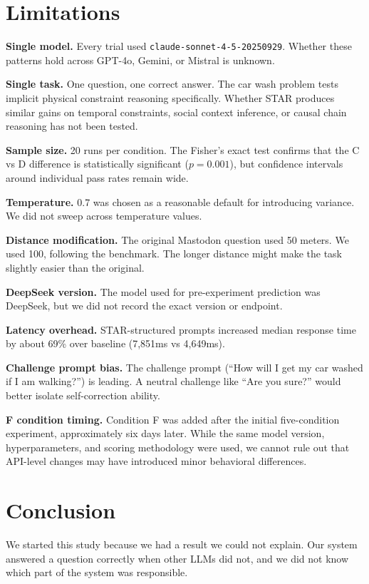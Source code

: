 \documentclass[11pt]{article}
\begin{document}
\section{Limitations}

\textbf{Single model.} Every trial used \texttt{claude-sonnet-4-5-20250929}. Whether these patterns hold across GPT-4o, Gemini, or Mistral is unknown.

\textbf{Single task.} One question, one correct answer. The car wash problem tests implicit physical constraint reasoning specifically. Whether STAR produces similar gains on temporal constraints, social context inference, or causal chain reasoning has not been tested.

\textbf{Sample size.} 20 runs per condition. The Fisher's exact test confirms that the C vs D difference is statistically significant ($p = 0.001$), but confidence intervals around individual pass rates remain wide.

\textbf{Temperature.} 0.7 was chosen as a reasonable default for introducing variance. We did not sweep across temperature values.

\textbf{Distance modification.} The original Mastodon question used 50 meters. We used 100, following the benchmark. The longer distance might make the task slightly easier than the original.

\textbf{DeepSeek version.} The model used for pre-experiment prediction was DeepSeek, but we did not record the exact version or endpoint.

\textbf{Latency overhead.} STAR-structured prompts increased median response time by about 69\% over baseline (7,851ms vs 4,649ms).

\textbf{Challenge prompt bias.} The challenge prompt (``How will I get my car washed if I am walking?'') is leading. A neutral challenge like ``Are you sure?'' would better isolate self-correction ability.

\textbf{F condition timing.} Condition F was added after the initial five-condition experiment, approximately six days later. While the same model version, hyperparameters, and scoring methodology were used, we cannot rule out that API-level changes may have introduced minor behavioral differences.

\section{Conclusion}

We started this study because we had a result we could not explain. Our system answered a question correctly when other LLMs did not, and we did not know which part of the system was responsible.
\end{document}
